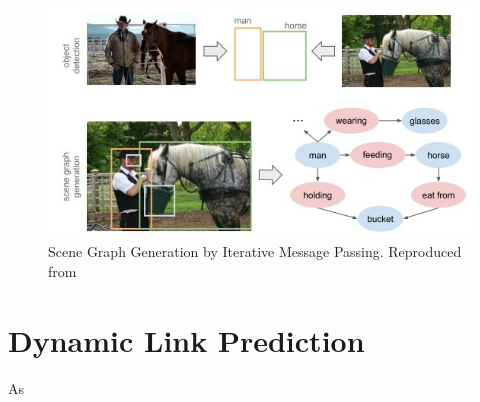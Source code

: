 \begin{figure}
    \centering
    \includegraphics[width=\linewidth]{figures/03_SGG.jpg}
    \caption{Scene Graph Generation by Iterative Message Passing. Reproduced from\cite{tang2020unbiased}}
    \label{fig:SGG}
\end{figure}

\section{Dynamic Link Prediction}

As 